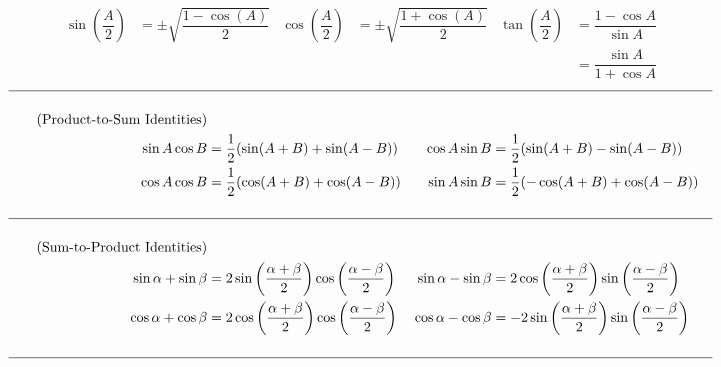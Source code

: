 \documentclass{book}
\begin{document}
\begin{appendices}
\begin{align}
\nonumber \sin\left(\dfrac{A}{2}\right) &= \pm\sqrt{\dfrac{1-\cos(A)}{2}} &\cos\left(\dfrac{A}{2}\right) &= \pm\sqrt{\dfrac{1+\cos(A)}{2}} & \tan\left(\dfrac{A}{2}\right) &= \dfrac{1-\cos A}{\sin A} \\\nonumber &&&&&= \dfrac{\sin A}{1+\cos A}
\end{align}
\begin{align}\hline\nonumber\\
\tag{Product-to-Sum Identities}\\
\nonumber \sin A \cos B &= \dfrac{1}{2}(\sin(A+B) +\sin(A-B)) & \cos A \sin B &= \dfrac{1}{2}(\sin(A+B) -\sin(A-B))\\
\nonumber \cos A \cos B &= \dfrac{1}{2}(\cos(A+B) +\cos(A-B)) & \sin A \sin B &=\dfrac{1}{2}(-\cos(A+B) +\cos(A-B))\\\nonumber\\\hline\nonumber\\
\tag{Sum-to-Product Identities}\\
\nonumber \sin\alpha +\sin\beta &= 2\sin\left(\dfrac{\alpha+\beta}{2}\right)\cos\left(\dfrac{\alpha-\beta}{2}\right) &
 \sin\alpha -\sin\beta &= 2\cos\left(\dfrac{\alpha+\beta}{2}\right)\sin\left(\dfrac{\alpha-\beta}{2}\right)\\
\nonumber \cos\alpha +\cos\beta &= 2\cos\left(\dfrac{\alpha+\beta}{2}\right)\cos\left(\dfrac{\alpha-\beta}{2}\right)
& \cos\alpha -\cos\beta &= -2\sin\left(\dfrac{\alpha+\beta}{2}\right)\sin\left(\dfrac{\alpha-\beta}{2}\right)\\\nonumber\\\hline\nonumber
\end{align}\vspace{-25pt}


\end{appendices}
\end{document}
